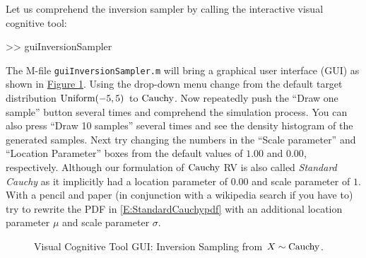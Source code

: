 \begin{labwork}\label{LW:guiInversionSamplerCauchy}
Let us comprehend the inversion sampler by calling the interactive visual cognitive tool:
\begin{VrbM}
>> guiInversionSampler
\end{VrbM}
The M-file {\tt guiInversionSampler.m} will bring a graphical user interface (GUI) as shown in \hyperref[F:guiInversionSamplerCauchy]{Figure \ref*{F:guiInversionSamplerCauchy}}.  Using the drop-down menu change from the default target distribution $\mbox{{\rm Uniform}}(-5,5)$ to $\mbox{{\rm Cauchy}}$.  Now repeatedly push the ``Draw one sample'' button several times and comprehend the simulation process.  You can also press ``Draw 10 samples'' several times and see the density histogram of the generated samples.  
Next try changing the numbers in the ``Scale parameter'' and ``Location Parameter'' boxes from the default values of $1.00$ and  $0.00$, respectively.  Although our formulation of $\mbox{{\rm Cauchy}}$ RV is also called {\em Standard Cauchy} as it implicitly had a location parameter of $0.00$ and scale parameter of $1$.  With a pencil and paper (in conjunction with a wikipedia search if you have to) try to rewrite the PDF in \eqref{E:StandardCauchypdf} with an additional location parameter $\mu$ and scale parameter $\sigma$.
\end{labwork}

\begin{figure}[htpb]
\caption{Visual Cognitive Tool GUI: Inversion Sampling from $X \sim \mbox{{\rm Cauchy}}$.\label{F:guiInversionSamplerCauchy}}
\centering   {}
\end{figure}

